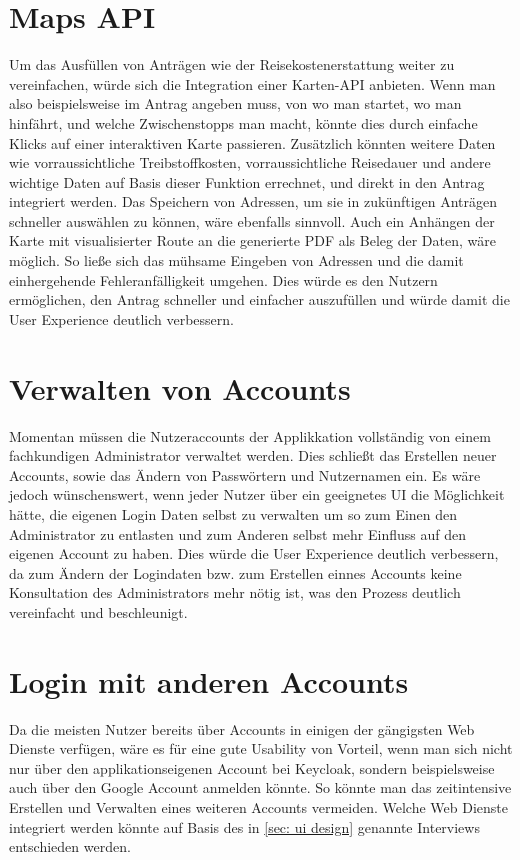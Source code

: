 \section{Maps \ac{API}}\label{sec: maps api}
Um das Ausfüllen von Anträgen wie der Reisekostenerstattung weiter zu vereinfachen, würde 
sich die Integration einer Karten-\ac{API} anbieten. Wenn man also beispielsweise im 
Antrag angeben muss, von wo man startet, wo man hinfährt, und welche Zwischenstopps man 
macht, könnte dies durch einfache Klicks auf einer interaktiven Karte passieren. Zusätzlich 
könnten weitere Daten wie vorraussichtliche Treibstoffkosten, vorraussichtliche Reisedauer 
und andere wichtige Daten auf Basis dieser Funktion errechnet, und direkt in den Antrag 
integriert werden. Das Speichern von Adressen, um sie in zukünftigen Anträgen schneller 
auswählen zu können, wäre ebenfalls sinnvoll.
Auch ein Anhängen der Karte mit visualisierter Route an die generierte
PDF als Beleg der Daten, wäre möglich. So ließe sich das mühsame Eingeben von Adressen 
und die damit einhergehende Fehleranfälligkeit umgehen. Dies würde es den Nutzern 
ermöglichen, den Antrag schneller und einfacher auszufüllen und würde damit die User 
Experience deutlich verbessern.

\section{Verwalten von Accounts}\label{sec: verwalten von Accounts}
Momentan müssen die Nutzeraccounts der Applikkation vollständig von einem fachkundigen 
Administrator verwaltet werden. Dies schließt das Erstellen neuer Accounts, sowie das 
Ändern von Passwörtern und Nutzernamen ein. Es wäre jedoch wünschenswert, wenn jeder 
Nutzer über ein geeignetes \ac{UI} die Möglichkeit hätte, die eigenen Login Daten selbst 
zu verwalten um so zum Einen den Administrator zu entlasten und zum Anderen selbst mehr 
Einfluss auf den eigenen Account zu haben. Dies würde die User Experience deutlich 
verbessern, da zum Ändern der Logindaten bzw. zum Erstellen einnes Accounts keine 
Konsultation des Administrators mehr nötig ist, was den Prozess deutlich vereinfacht und 
beschleunigt.

\section{Login mit anderen Accounts}\label{sec: login mit anderen Accounts}
Da die meisten Nutzer bereits über Accounts in einigen der gängigsten Web Dienste verfügen, 
wäre es für eine gute Usability von Vorteil, wenn man sich nicht nur über den 
applikationseigenen Account bei Keycloak, sondern beispielsweise auch über den Google 
Account anmelden könnte. So könnte man das zeitintensive Erstellen und Verwalten eines 
weiteren Accounts vermeiden. Welche Web Dienste integriert werden könnte auf Basis des in 
\ref{sec: ui design} genannte Interviews entschieden werden.


